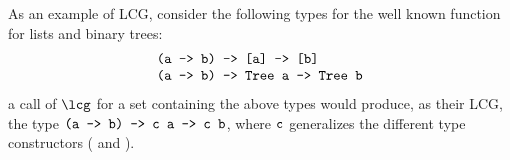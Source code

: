 As an example of LCG, consider the following types for
the well known  function for lists and binary trees:
\[
  \begin{array}{l}
       \texttt{(a -> b) -> [a] -> [b]}\\
       \texttt{(a -> b) -> Tree a -> Tree b}
  \end{array}
\]
a call of $\lcg$ for a set containing the above types would produce,
as their LCG, the type $\texttt{(a -> b) -> c a -> c b}$, where $\texttt{c}$ generalizes the different type
constructors (\haskell{[]} and ). 

